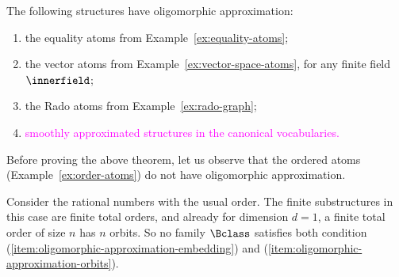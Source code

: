 \begin{theorem}\label{thm:have-oligomorphic-approximation}
    The following structures have oligomorphic approximation: 
    \begin{enumerate}
        \item the equality atoms from Example~\ref{ex:equality-atoms};
        \item the vector atoms from Example~\ref{ex:vector-space-atoms}, for any finite field $\innerfield$;
        \item \label{item:rado-has-oligomorphic-approximation} the Rado atoms from Example~\ref{ex:rado-graph};
        \item \textcolor{magenta}{smoothly approximated structures in the canonical vocabularies.}
    \end{enumerate}
\end{theorem}
Before proving the above theorem, let us observe that the ordered atoms (Example~\ref{ex:order-atoms}) do not have oligomorphic approximation.

\begin{non-example}\label{non-ex:weak-smooth-approximation}
Consider the rational numbers with the usual order. 
The finite substructures in this case are finite total orders, and already for dimension $d=1$, a finite total order of size $n$ has $n$ orbits. 
So no family $\Bclass$ satisfies both condition (\ref{item:oligomorphic-approximation-embedding}) and (\ref{item:oligomorphic-approximation-orbits}).
\end{non-example}

